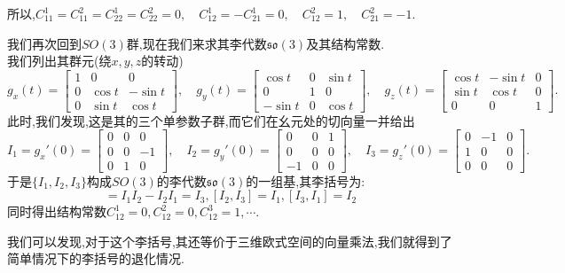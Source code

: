 \begin{example}
\begin{equation}
	\end{equation}
	所以,$C_{11}^1=C_{11}^2=C_{22}^1=C_{22}^2=0,\quad C_{12}^1=-C_{21}^1=0,\quad C_{12}^2=1,\quad C_{21}^2=-1.$
\end{example}
\begin{example}
	我们再次回到$SO(3)$群,现在我们来求其李代数$\mathfrak{so}(3)$及其结构常数.\\
	我们列出其群元(绕$x,y,z$的转动)
	\begin{equation}
		g_{x}(t)=\begin{bmatrix}1&0&0\\0&\cos t&-\sin t\\0&\sin t&\cos t\end{bmatrix},\quad g_y(t)=\begin{bmatrix}\cos t&0&\sin t\\0&1&0\\-\sin t&0&\cos t\end{bmatrix},\quad g_{z}(t)=\begin{bmatrix}\cos t&-\sin t&0\\\sin t&\cos t&0\\0&0&1\end{bmatrix}.
	\end{equation}
	此时,我们发现,这是其的三个单参数子群,而它们在幺元处的切向量一并给出
	\begin{equation}
		I_{1}=g_{x}'(0)=\begin{bmatrix}0&0&0\\0&0&-1\\0&1&0\end{bmatrix},\quad I_{2}=g_{y}'(0)=\begin{bmatrix}0&0&1\\0&0&0\\-1&0&0\end{bmatrix},\quad I_{3}=g_{z}'(0)=\begin{bmatrix}0&-1&0\\1&0&0\\0&0&0\end{bmatrix}.
	\end{equation}
	于是$\{I_1,I_2,I_3\}$构成$SO(3)$的李代数$\mathfrak{so}(3)$的一组基,其李括号为:
	\begin{equation}
		[I_1,I_2]=I_1I_2-I_2I_1=I_3,[I_2,I_3]=I_1,[I_3,I_1]=I_2
	\end{equation}
	同时得出结构常数$C_{12}^{ 1}=0,C_{12}^{ 2}=0,C_{12}^{ 3}=1,\cdots.$
	
	我们可以发现,对于这个李括号,其还等价于三维欧式空间的向量乘法,我们就得到了简单情况下的李括号的退化情况.
 \end{example}
  
